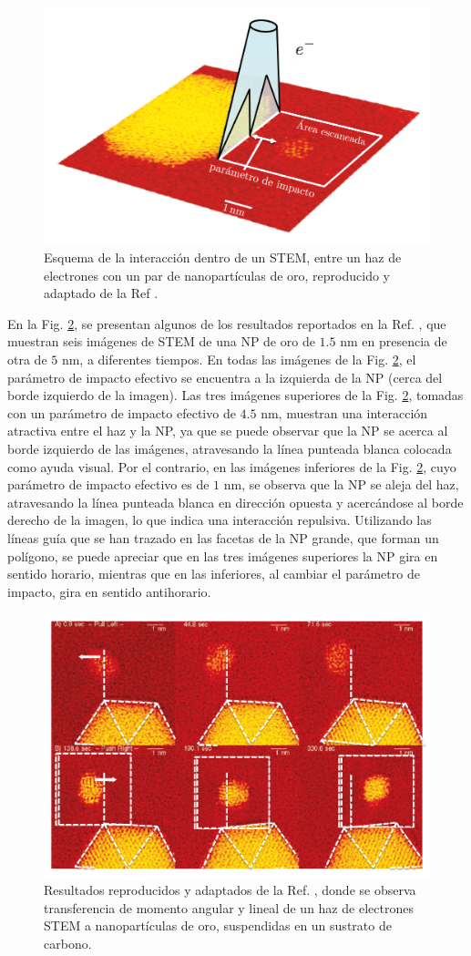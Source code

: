 \begin{figure}[h!]
\centering
\includegraphics[width=0.6\linewidth]{17-imagenes/1-Intro/STEM}
\caption{\label{fig: Batson STEM} Esquema de la interacción dentro de un STEM, entre un haz de electrones con un par de nanopartículas de oro, reproducido y adaptado de la Ref \cite{Batson}.} 
\end{figure}

En la Fig. \ref{fig: Batson momentum transfer}, se presentan algunos de los resultados reportados en la Ref. \cite{Batson}, que muestran seis imágenes de STEM de una NP de oro de $1.5$ nm en presencia de otra de $5$ nm, a diferentes tiempos. En todas las imágenes de la Fig. \ref{fig: Batson momentum transfer}, el parámetro de impacto efectivo se encuentra a la izquierda de la NP (cerca del borde izquierdo de la imagen). Las tres imágenes superiores de la Fig. \ref{fig: Batson momentum transfer}, tomadas con un parámetro de impacto efectivo de $4.5$ nm, muestran una interacción atractiva entre el haz y la NP, ya que se puede observar que la NP se acerca al borde izquierdo de las imágenes, atravesando la línea punteada blanca colocada como ayuda visual. Por el contrario, en las imágenes inferiores de la Fig. \ref{fig: Batson momentum transfer}, cuyo  parámetro de impacto efectivo es de $1$ nm,  se observa que la NP se aleja del haz, atravesando la línea punteada blanca en dirección opuesta y acercándose al borde derecho de la imagen, lo que indica una interacción repulsiva. Utilizando las líneas guía que se han trazado en las facetas de la NP grande, que forman un polígono, se puede apreciar que en las tres imágenes superiores la NP gira en sentido horario, mientras que en las inferiores, al cambiar el parámetro de impacto, gira en sentido antihorario.

\begin{figure}[h!]
\centering
\includegraphics[width=0.6\linewidth]{17-imagenes/1-Intro/Batson}
\caption{\label{fig: Batson momentum transfer} Resultados reproducidos y adaptados de la Ref. \cite{Batson}, donde se observa transferencia de momento angular y lineal de un haz de electrones STEM a nanopartículas de oro, suspendidas en un sustrato de carbono.} 
\end{figure}

